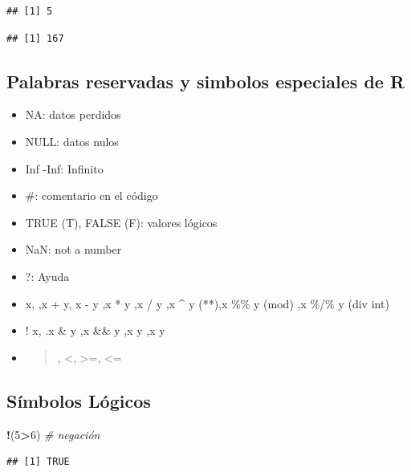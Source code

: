 \documentclass[
]{book}
\newenvironment{Shaded}{\begin{snugshade}}{\end{snugshade}}
\newcommand{\CommentTok}[1]{\textcolor[rgb]{0.56,0.35,0.01}{\textit{#1}}}
\newcommand{\DecValTok}[1]{\textcolor[rgb]{0.00,0.00,0.81}{#1}}
\newcommand{\NormalTok}[1]{#1}
\newcommand{\OperatorTok}[1]{\textcolor[rgb]{0.81,0.36,0.00}{\textbf{#1}}}
\begin{document}
\begin{verbatim}
## [1] 5
\end{verbatim}

\begin{verbatim}
## [1] 167
\end{verbatim}

\hypertarget{palabras-reservadas-y-simbolos-especiales-de-r}{%
\subsection{Palabras reservadas y simbolos especiales de R}\label{palabras-reservadas-y-simbolos-especiales-de-r}}

\begin{itemize}
\item
  NA: datos perdidos
\item
  NULL: datos nulos
\item
  Inf -Inf: Infinito
\item
  \#: comentario en el código
\item
  TRUE (T), FALSE (F): valores lógicos
\item
  NaN: not a number
\item
  ?: Ayuda
\item
  x, ,x + y, x - y ,x * y ,x / y ,x \^{} y (**),x \%\% y (mod) ,x \%/\% y (div int)
\item
  ! x, .x \& y ,x \&\& y ,x \textbar{} y ,x \textbar\textbar{} y
\item
  \begin{quote}
  , \textless, \textgreater=, \textless=
  \end{quote}
\end{itemize}

\hypertarget{suxedmbolos-luxf3gicos}{%
\subsection{Símbolos Lógicos}\label{suxedmbolos-luxf3gicos}}

\begin{Shaded}
\begin{Highlighting}[]
\OperatorTok{!}\NormalTok{(}\DecValTok{5}\OperatorTok{>}\DecValTok{6}\NormalTok{) }\CommentTok{# negación}
\end{Highlighting}
\end{Shaded}

\begin{verbatim}
## [1] TRUE
\end{verbatim}
\end{document}
